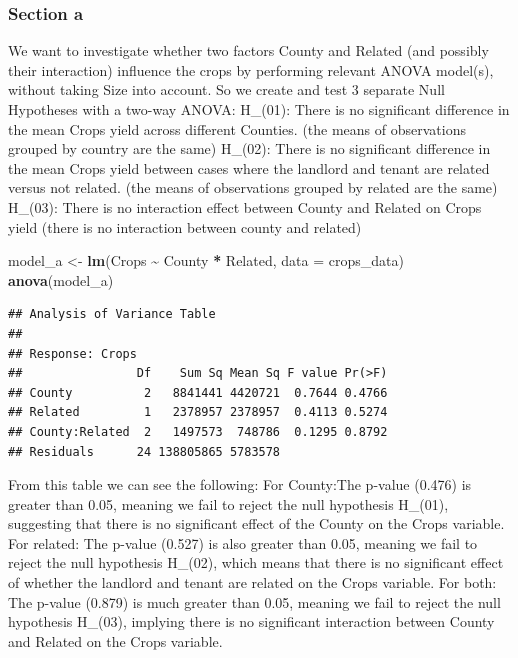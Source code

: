 \documentclass[
  11pt,
]{article}
\newenvironment{Shaded}{\begin{snugshade}}{\end{snugshade}}
\newcommand{\AttributeTok}[1]{\textcolor[rgb]{0.13,0.29,0.53}{#1}}
\newcommand{\FunctionTok}[1]{\textcolor[rgb]{0.13,0.29,0.53}{\textbf{#1}}}
\newcommand{\NormalTok}[1]{#1}
\newcommand{\OtherTok}[1]{\textcolor[rgb]{0.56,0.35,0.01}{#1}}
\newcommand{\SpecialCharTok}[1]{\textcolor[rgb]{0.81,0.36,0.00}{\textbf{#1}}}
\begin{document}
\subsubsection{Section a}\label{section-a-1}

We want to investigate whether two factors County and Related (and
possibly their interaction) influence the crops by performing relevant
ANOVA model(s), without taking Size into account. So we create and test
3 separate Null Hypotheses with a two-way ANOVA: H\_(01): There is no
significant difference in the mean Crops yield across different
Counties. (the means of observations grouped by country are the same)
H\_(02): There is no significant difference in the mean Crops yield
between cases where the landlord and tenant are related versus not
related. (the means of observations grouped by related are the same)
H\_(03): There is no interaction effect between County and Related on
Crops yield (there is no interaction between county and related)

\begin{Shaded}
\begin{Highlighting}[]
\NormalTok{model\_a }\OtherTok{\textless{}{-}} \FunctionTok{lm}\NormalTok{(Crops }\SpecialCharTok{\textasciitilde{}}\NormalTok{ County }\SpecialCharTok{*}\NormalTok{ Related, }\AttributeTok{data =}\NormalTok{ crops\_data)}
\FunctionTok{anova}\NormalTok{(model\_a)}
\end{Highlighting}
\end{Shaded}

\begin{verbatim}
## Analysis of Variance Table
## 
## Response: Crops
##                Df    Sum Sq Mean Sq F value Pr(>F)
## County          2   8841441 4420721  0.7644 0.4766
## Related         1   2378957 2378957  0.4113 0.5274
## County:Related  2   1497573  748786  0.1295 0.8792
## Residuals      24 138805865 5783578
\end{verbatim}

From this table we can see the following: For County:The p-value (0.476)
is greater than 0.05, meaning we fail to reject the null hypothesis
H\_(01), suggesting that there is no significant effect of the County on
the Crops variable. For related: The p-value (0.527) is also greater
than 0.05, meaning we fail to reject the null hypothesis H\_(02), which
means that there is no significant effect of whether the landlord and
tenant are related on the Crops variable. For both: The p-value (0.879)
is much greater than 0.05, meaning we fail to reject the null hypothesis
H\_(03), implying there is no significant interaction between County and
Related on the Crops variable.
\end{document}
